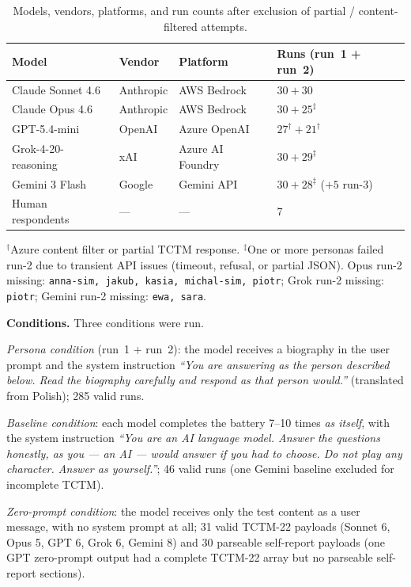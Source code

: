 \documentclass[11pt,a4paper]{article}
\begin{document}
\begin{table}[htbp]\centering\footnotesize
\caption{Models, vendors, platforms, and run counts after exclusion of partial / content-filtered attempts.}
\label{tab:models}
\begin{tabular}{llll}
\toprule
\textbf{Model} & \textbf{Vendor} & \textbf{Platform} & \textbf{Runs (run~1 + run~2)} \\
\midrule
Claude Sonnet 4.6 & Anthropic & AWS Bedrock & $30 + 30$ \\
Claude Opus 4.6 & Anthropic & AWS Bedrock & $30 + 25^{\ddagger}$ \\
GPT-5.4-mini & OpenAI & Azure OpenAI & $27^{\dagger} + 21^{\dagger}$ \\
Grok-4-20-reasoning & xAI & Azure AI Foundry & $30 + 29^{\ddagger}$ \\
Gemini 3 Flash & Google & Gemini API & $30 + 28^{\ddagger}$ ($+5$ run-3) \\
\midrule
Human respondents & --- & --- & 7 \\
\bottomrule
\end{tabular}
\begin{flushleft}
\footnotesize $^{\dagger}$Azure content filter or partial TCTM response. $^{\ddagger}$One or more personas failed run-2 due to transient API issues (timeout, refusal, or partial JSON). Opus run-2 missing: \texttt{anna-sim, jakub, kasia, michal-sim, piotr}; Grok run-2 missing: \texttt{piotr}; Gemini run-2 missing: \texttt{ewa, sara}.
\end{flushleft}
\end{table}

\textbf{Conditions.} Three conditions were run.

\emph{Persona condition} (run~1 + run~2): the model receives a biography in the user prompt and the system instruction \textit{``You are answering as the person described below. Read the biography carefully and respond as that person would.''} (translated from Polish); 285 valid runs.

\emph{Baseline condition}: each model completes the battery 7--10 times \emph{as itself}, with the system instruction \textit{``You are an AI language model. Answer the questions honestly, as you --- an AI --- would answer if you had to choose. Do not play any character. Answer as yourself.''}; 46 valid runs (one Gemini baseline excluded for incomplete TCTM).

\emph{Zero-prompt condition}: the model receives only the test content as a user message, with no system prompt at all; 31 valid TCTM-22 payloads (Sonnet 6, Opus 5, GPT 6, Grok 6, Gemini 8) and 30 parseable self-report payloads (one GPT zero-prompt output had a complete TCTM-22 array but no parseable self-report sections).
\end{document}
